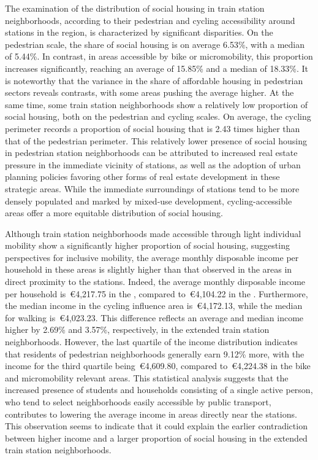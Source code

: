 \begin{refsegment}
The examination of the distribution of social housing in train station neighborhoods, according to their pedestrian and cycling accessibility around stations in the region, is characterized by significant disparities. On the pedestrian scale, the share of social housing is on average 6.53\%, with a median of 5.44\%. In contrast, in areas accessible by bike or micromobility, this proportion increases significantly, reaching an average of 15.85\% and a median of 18.33\%. It is noteworthy that the variance in the share of affordable housing in pedestrian sectors reveals contrasts, with some areas pushing the average higher. At the same time, some train station neighborhoods show a relatively low proportion of social housing, both on the pedestrian and cycling scales. On average, the cycling perimeter records a proportion of social housing that is 2.43 times higher than that of the pedestrian perimeter. This relatively lower presence of social housing in pedestrian station neighborhoods can be attributed to increased real estate pressure in the immediate vicinity of stations, as well as the adoption of urban planning policies favoring other forms of real estate development in these strategic areas. While the immediate surroundings of stations tend to be more densely populated and marked by mixed-use development, cycling-accessible areas offer a more equitable distribution of social housing.%

Although train station neighborhoods made accessible through light individual mobility show a significantly higher proportion of social housing, suggesting perspectives for inclusive mobility, the average monthly disposable income per household in these areas is slightly higher than that observed in the areas in direct proximity to the stations. Indeed, the average monthly disposable income per household is~\euro4,217.75 in the , compared to~\euro4,104.22 in the . Furthermore, the median income in the cycling influence area is~\euro4,172.13, while the median for walking is~\euro4,023.23. This difference reflects an average and median income higher by 2.69\% and 3.57\%, respectively, in the extended train station neighborhoods. However, the last quartile of the income distribution indicates that residents of pedestrian neighborhoods generally earn 9.12\% more, with the income for the third quartile being~\euro4,609.80, compared to~\euro4,224.38 in the bike and micromobility relevant areas. This statistical analysis suggests that the increased presence of students and households consisting of a single active person, who tend to select neighborhoods easily accessible by public transport, contributes to lowering the average income in areas directly near the stations. This observation seems to indicate that it could explain the earlier contradiction between higher income and a larger proportion of social housing in the extended train station neighborhoods.%


\end{refsegment}
